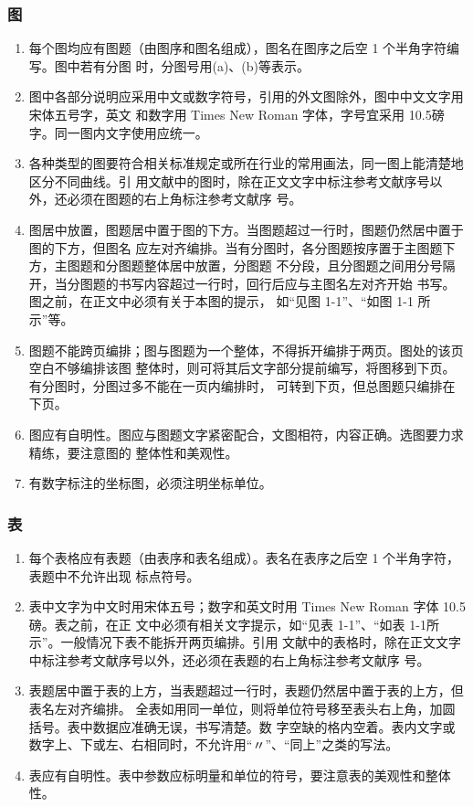 \subsubsection{图}
\label{sec:fig}

\begin{enumerate}
\item 每个图均应有图题（由图序和图名组成），图名在图序之后空 1 个半角字符编写。图中若有分图
  时，分图号用(a)、(b)等表示。
\item 图中各部分说明应采用中文或数字符号，引用的外文图除外，图中中文文字用宋体五号字，英文
  和数字用 Times New Roman 字体，字号宜采用 10.5磅字。同一图内文字使用应统一。
\item 各种类型的图要符合相关标准规定或所在行业的常用画法，同一图上能清楚地区分不同曲线。引
  用文献中的图时，除在正文文字中标注参考文献序号以外，还必须在图题的右上角标注参考文献序
  号。
\item 图居中放置，图题居中置于图的下方。当图题超过一行时，图题仍然居中置于图的下方，但图名
  应左对齐编排。当有分图时，各分图题按序置于主图题下方，主图题和分图题整体居中放置，分图题
  不分段，且分图题之间用分号隔开，当分图题的书写内容超过一行时，回行后应与主图名左对齐开始
  书写。图之前，在正文中必须有关于本图的提示，
  如“见图 1-1”、“如图 1-1 所示”等。
\item 图题不能跨页编排；图与图题为一个整体，不得拆开编排于两页。图处的该页空白不够编排该图
  整体时，则可将其后文字部分提前编写，将图移到下页。有分图时，分图过多不能在一页内编排时，
  可转到下页，但总图题只编排在下页。
\item 图应有自明性。图应与图题文字紧密配合，文图相符，内容正确。选图要力求精练，要注意图的
  整体性和美观性。
\item 有数字标注的坐标图，必须注明坐标单位。
\end{enumerate}

\subsubsection{表}
\label{sec:tab}

\begin{enumerate}
\item 每个表格应有表题（由表序和表名组成）。表名在表序之后空 1 个半角字符，表题中不允许出现
  标点符号。
\item 表中文字为中文时用宋体五号；数字和英文时用 Times New Roman 字体 10.5磅。表之前，在正
  文中必须有相关文字提示，如“见表 1-1”、“如表 1-1所示”。一般情况下表不能拆开两页编排。引用
  文献中的表格时，除在正文文字中标注参考文献序号以外，还必须在表题的右上角标注参考文献序
  号。
\item 表题居中置于表的上方，当表题超过一行时，表题仍然居中置于表的上方，但表名左对齐编排。
  全表如用同一单位，则将单位符号移至表头右上角，加圆括号。表中数据应准确无误，书写清楚。数
  字空缺的格内空着。表内文字或数字上、下或左、右相同时，不允许用“〃”、“同上”之类的写法。
\item 表应有自明性。表中参数应标明量和单位的符号，要注意表的美观性和整体性。
\end{enumerate}

